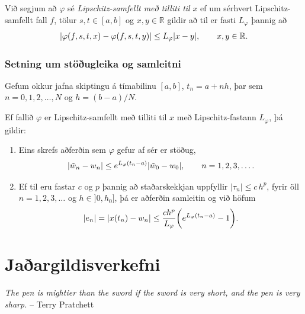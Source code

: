 \documentclass[letterpaper,10pt,icelandic]{sphinxmanual}
\begin{document}
Við segjum að \(\varphi\) sé \emph{Lipschitz-samfellt með tilliti til}
\(x\) ef um sérhvert Lipschitz-samfellt fall \(f\), tölur
\(s,t\in [a,b]\) og \(x,y\in {{\mathbb  R}}\) gildir að til er
fasti \(L_\varphi\) þannig að
\begin{gather}
\begin{split}|\varphi(f,s,t,x)-\varphi(f,s,t,y)|\leq L_\varphi|x-y|, \qquad x,y\in {{\mathbb  R}}.\end{split}\notag
\end{gather}

\subsection{Setning um stöðugleika og samleitni}
\label{kafli06:setning-um-stougleika-og-samleitni}
Gefum okkur jafna skiptingu á tímabilinu \([a,b]\),
\(t_n=a+nh\), þar sem \(n=0,1,2,\dots,N\) og \(h=(b-a)/N\).

Ef fallið \(\varphi\) er Lipschitz-samfellt með tilliti til
\(x\) með Lipschitz-fastann \(L_\varphi\), þá gildir:
\begin{enumerate}
\item {} 
Eins skrefs aðferðin sem \(\varphi\) gefur af sér er stöðug,
\begin{gather}
\begin{split}|\tilde w_n-w_n|\leq e^{L_\varphi(t_n-a)}|\tilde w_0-w_0|, \qquad
n=1,2,3,\dots.\end{split}\notag
\end{gather}
\item {} 
Ef til eru fastar \(c\) og \(p\) þannig að staðarskekkjan
uppfyllir \(|\tau_n|\leq c\, h^p\), fyrir öll
\(n=1,2,3,\dots\) og \(h\in ]0,h_0]\), þá er aðferðin
samleitin og við höfum
\begin{gather}
\begin{split}|e_n|=|x(t_n)-w_n|\leq \dfrac{ch^p}{L_\varphi}
\bigg(e^{L_\varphi(t_n-a)}-1\bigg).\end{split}\notag
\end{gather}
\end{enumerate}


\chapter{Jaðargildisverkefni}
\label{kafli07::doc}\label{kafli07:jaargildisverkefni}\label{kafli07:index-0}
\emph{The pen is mightier than the sword if the sword is very short, and the pen is very sharp.}
-- Terry Pratchett
\end{document}
